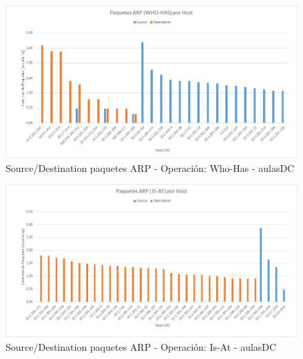 \begin{figure}[h!]
\centering
\includegraphics[scale=0.7]{./img/arp_whoHas_aulasDC.jpg}
\caption{Source/Destination paquetes ARP - Operación: Who-Has - aulasDC}
\end{figure}

\begin{figure}[h!]
\centering
\includegraphics[scale=0.7]{./img/arp_isAt_aulasDC.jpg}
\caption{Source/Destination paquetes ARP - Operación: Is-At - aulasDC}
\end{figure}

